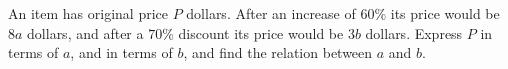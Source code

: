An item has original price $P$ dollars. After an increase of $60\%$ its price would be $8a$ dollars, and after a $70\%$ discount its price would be $3b$ dollars. Express $P$ in terms of $a$, and in terms of $b$, and find the relation between $a$ and $b$.

